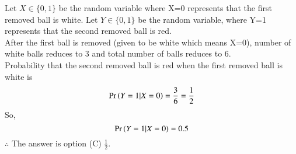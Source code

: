 Let $X\in\{0,1\}$ be the random variable where X=0 represents that the first removed ball is white.
Let $Y\in\{0,1\}$ be the random variable, where Y=1 represents that the second removed ball is red. \\
After the first ball is removed (given to be white which means X=0), 
number of white balls reduces to 3 and total number of balls reduces to 6.\\
Probability that the second removed ball is red when the first removed ball is white is 
\begin{align}
 \Pr\left(Y=1|X=0\right)= \frac{3}{6} = \frac{1}{2} 
\end{align}
So,
\begin{equation}
 \Pr\left(Y=1|X=0\right) = 0.5
\end{equation}
$\therefore$ The answer is option (C) $\frac{1}{2}$.